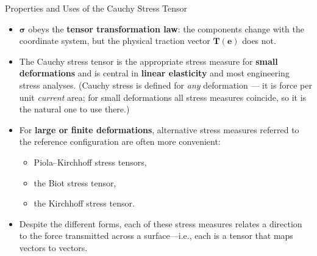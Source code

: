 \documentclass[aspectratio=169,11pt]{beamer}
\begin{document}
\begin{frame}{Properties and Uses of the Cauchy Stress Tensor}

\begin{itemize}

    \item $\boldsymbol{\sigma}$ obeys the \textbf{tensor transformation law}:
    the components change with the coordinate system, but the physical
    traction vector $\mathbf{T}(\mathbf{e})$ does not.


    \item The Cauchy stress tensor is the appropriate stress measure for
          \textbf{small deformations} and is central in
          \textbf{linear elasticity} and most engineering stress analyses.
          (Cauchy stress is defined for \emph{any} deformation --- it is force per unit \emph{current} area; for small deformations all stress measures coincide, so it is the natural one to use there.)

    \item For \textbf{large or finite deformations}, alternative stress measures
          referred to the reference configuration are often more convenient:
    \begin{itemize}
        \item Piola–Kirchhoff stress tensors,
        \item the Biot stress tensor,
        \item the Kirchhoff stress tensor.
    \end{itemize}

    \item Despite the different forms, each of these stress measures relates
          a direction to the force transmitted across a surface—i.e., each
          is a tensor that maps vectors to vectors.

\end{itemize}

\end{frame}
\end{document}
